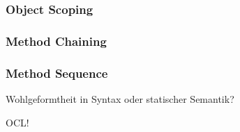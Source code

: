 \documentclass[../InterneDSLs.tex]{subfiles}
\begin{document}
\subsubsection{Object Scoping}
\subsubsection{Method Chaining}
\subsubsection{Method Sequence}


Wohlgeformtheit in Syntax oder statischer Semantik?

OCL!
\end{document}

